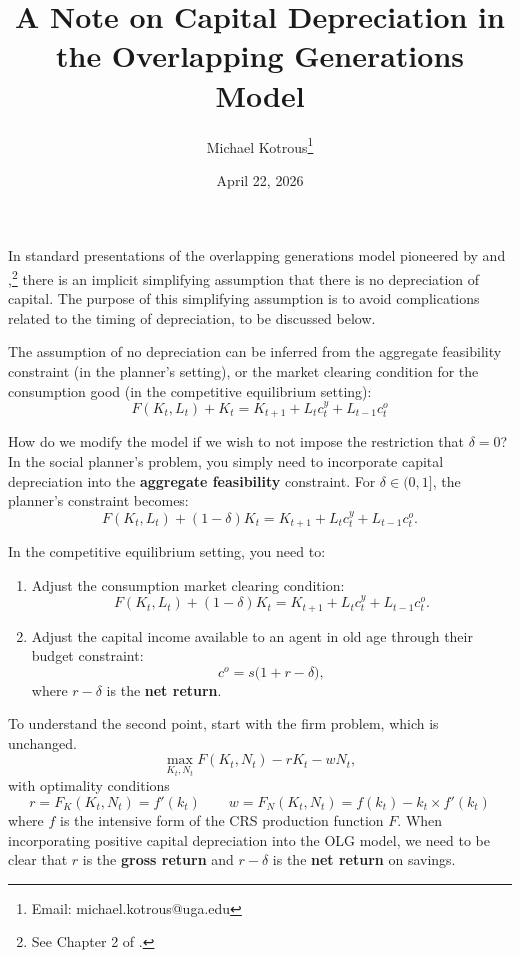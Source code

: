 \documentclass[11pt]{article}
\title{A Note on Capital Depreciation in the Overlapping Generations Model}
\author[1]{Michael Kotrous\thanks{Email: michael.kotrous@uga.edu}}
\affil[1]{John Munro Godfrey, Sr. Department of Economics\\University of Georgia}
\date{April 22, 2026}
\begin{document}
\symbolfootnotes
\maketitle
\setcounter{page}{1}
\setcounter{footnote}{0}
\arabicfootnotes

In standard presentations of the overlapping generations model pioneered by \textcite{Samuelson1958} and \textcite{Diamond1965},\footnote{See Chapter 2 of \textcite{williamson1999macro}.} there is an implicit simplifying assumption that there is no depreciation of capital. The purpose of this simplifying assumption is to avoid complications related to the timing of depreciation, to be discussed below.

The assumption of no depreciation can be inferred from the aggregate feasibility constraint (in the planner's setting), or the market clearing condition for the consumption good (in the competitive equilibrium setting): 
\[ 
F(K_t, L_t) + K_t = K_{t+1} + L_t c_t^y + L_{t-1} c_t^o 
\]

How do we modify the model if we wish to not impose the restriction that \(\delta = 0\)? In the social planner's problem, you simply need to incorporate capital depreciation into the \textbf{aggregate feasibility} constraint. For \(\delta \in (0,1]\), the planner's constraint becomes:
\[
    F(K_t, L_t) + (1 - \delta)K_t = K_{t+1} + L_t c_t^y + L_{t-1} c_t^o.
\]

In the competitive equilibrium setting, you need to:

\begin{enumerate}
    \item Adjust the consumption market clearing condition:
    \[
        F(K_t, L_t) + (1 - \delta)K_t = K_{t+1} + L_t c_t^y + L_{t-1} c_t^o.
    \]
    
    \item Adjust the capital income available to an agent in old age through their budget constraint:
    \[
        c^o = s\bigl(1 + r - \delta\bigr),
    \]
    where \(r - \delta\) is the \textbf{net return}.
\end{enumerate}

To understand the second point, start with the firm problem, which is unchanged.
\[
    \max_{K_t, N_t} F(K_t, N_t) - r K_t - w N_t,
\]
with optimality conditions
\[
    r = F_K(K_t, N_t) = f'(k_t) \qquad w = F_N(K_t, N_t) = f(k_t) - k_t \times f'(k_t)
\]
where \(f\) is the intensive form of the CRS production function \(F\). When incorporating positive capital depreciation into the OLG model, we need to be clear that \(r\) is the \textbf{gross return} and \(r - \delta\) is the \textbf{net return} on savings.
\end{document}
